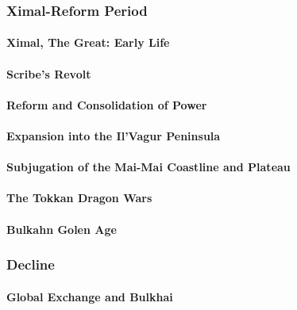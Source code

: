 	\subsubsection{Ximal-Reform Period}
		\paragraph{Ximal, The Great: Early Life}
		\paragraph{Scribe's Revolt}
		\paragraph{Reform and Consolidation of Power}
		\paragraph{Expansion into the Il'Vagur Peninsula}
		\paragraph{Subjugation of the Mai-Mai Coastline and Plateau}
		\paragraph{The Tokkan Dragon Wars}
		\paragraph{Bulkahn Golen Age}
	\subsubsection{Decline}
		\paragraph{Global Exchange and Bulkhai}
				